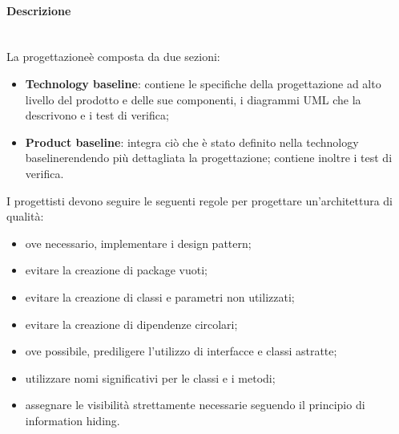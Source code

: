 \paragraph*{Descrizione}\mbox{}\\ [1mm]
La progettazione\glosp è composta da due sezioni:
\begin{itemize}
	\item \textbf{Technology baseline\glo}: contiene le specifiche della progettazione ad alto livello del prodotto e delle sue componenti, i diagrammi UML che la descrivono e i test di verifica;
	\item \textbf{Product baseline\glo}: integra ciò che è stato definito nella technology baseline\glosp rendendo più dettagliata la progettazione; contiene inoltre i test di verifica.	
\end{itemize}

I progettisti devono seguire le seguenti regole per progettare un'architettura di qualità:
\begin{itemize}
	\item ove necessario, implementare i design pattern\glo;
	\item evitare la creazione di package vuoti;
	\item evitare la creazione di classi e parametri non utilizzati;
	\item evitare la creazione di dipendenze circolari;
	\item ove possibile, prediligere l'utilizzo di interfacce e classi astratte;
	\item utilizzare nomi significativi per le classi e i metodi;
	\item assegnare le visibilità strettamente necessarie seguendo il principio di information hiding.
\end{itemize}

